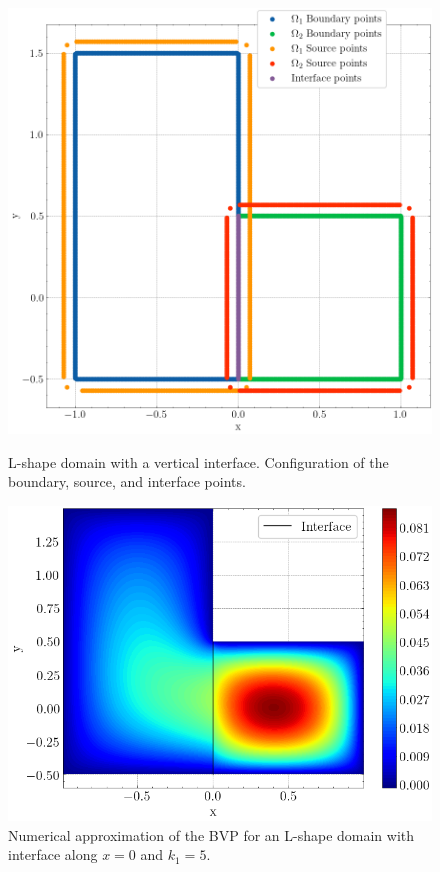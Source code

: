 \begin{figure}[!htb]
    \centering
    \begin{minipage}{.5\textwidth}
        \centering
        \includegraphics[width=0.8\linewidth]{Images/Transmission/L_shape_2_rectangles_col_points.png}
        \captionsetup{width=0.9\linewidth} %
        \caption{L-shape domain with a vertical interface. Configuration of the boundary, source, and interface points.}
        \label{transmission_L_shape_config}
    \end{minipage}%
    \begin{minipage}{.5\textwidth}
        \centering
        \includegraphics[width=\linewidth]{Images/Transmission/L_shape_2_rectangles_k1_5.png}
        \captionsetup{width=0.9\linewidth} %
        \caption{Numerical approximation of the \ac{BVP} for an L-shape domain with interface along \(x=0\) and \(k_1=5\).}
        \label{transmission_L_shape_k1_5}
    \end{minipage}
\end{figure}

